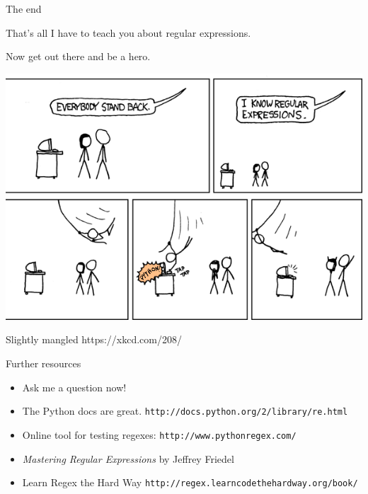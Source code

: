 \documentclass{beamer}
\begin{document}
\begin{frame}{The end}

That's all I have to teach you about regular expressions.

\bigskip

Now get out there and be a hero.

\begin{center}
\includegraphics[scale=0.4]{images/regular_expressions_altered.png} 
\end{center}

Slightly mangled https://xkcd.com/208/

\end{frame}


\begin{frame}{Further resources}

\begin{itemize}
 \item Ask me a question now! \bigskip

 \item The Python docs are great. \lstinline$http://docs.python.org/2/library/re.html$
 \item Online tool for testing regexes: \lstinline$http://www.pythonregex.com/$
 \item {\it Mastering Regular Expressions} by Jeffrey Friedel
 \item Learn Regex the Hard Way \lstinline$http://regex.learncodethehardway.org/book/$
\end{itemize}

\end{frame}
\end{document}
